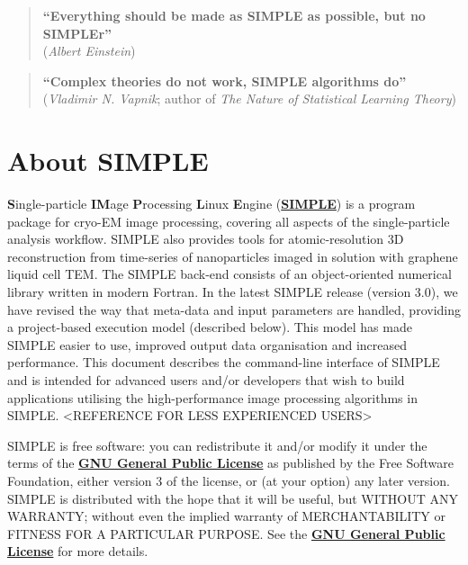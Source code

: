\documentclass[a4paper,11pt]{article}
\begin{document}
\begin{quote}
\textbf{``Everything should be made as SIMPLE as possible, but no SIMPLEr''}\\(\textit{Albert Einstein})
\end{quote}

\begin{quote}
\textbf{``Complex theories do not work, SIMPLE algorithms do''}\\(\textit{Vladimir N. Vapnik}; author of \textit{The Nature of Statistical Learning Theory})
\end{quote}
\clearpage

\tableofcontents{}
\clearpage

\section{About SIMPLE}

\textbf{S}ingle-particle \textbf{IM}age \textbf{P}rocessing \textbf{L}inux \textbf{E}ngine (\href{www.simplecryoem.com}{\textbf{\textcolor{BurntOrange}{SIMPLE}}}) is a program package for cryo-EM image processing, covering all aspects of the single-particle analysis workflow. SIMPLE also provides tools for atomic-resolution 3D reconstruction from time-series of nanoparticles imaged in solution with graphene liquid cell TEM. The SIMPLE back-end consists of an object-oriented numerical library written in modern Fortran. In the latest SIMPLE release (version 3.0), we have revised the way that meta-data and input parameters are handled, providing a project-based execution model (described below). This model has made SIMPLE easier to use, improved output data organisation and increased performance. This document describes the command-line interface of SIMPLE and is intended for advanced users and/or developers that wish to build applications utilising the high-performance image processing algorithms in SIMPLE. <REFERENCE FOR LESS EXPERIENCED USERS>
 
SIMPLE is free software: you can redistribute it and/or modify it under the terms of the \href{http://www.gnu.org/copyleft/gpl.html}{\textbf{\textcolor{BurntOrange}{GNU General Public License}}} as published by the Free Software Foundation, either version 3 of the license, or (at your option) any later version. SIMPLE is distributed with the hope that it will be useful, but WITHOUT ANY WARRANTY; without even the implied warranty of MERCHANTABILITY or FITNESS FOR A PARTICULAR PURPOSE. See the \href{http://www.gnu.org/copyleft/gpl.html}{\textbf{\textcolor{BurntOrange}{GNU General Public License}}} for more details.
\end{document}
